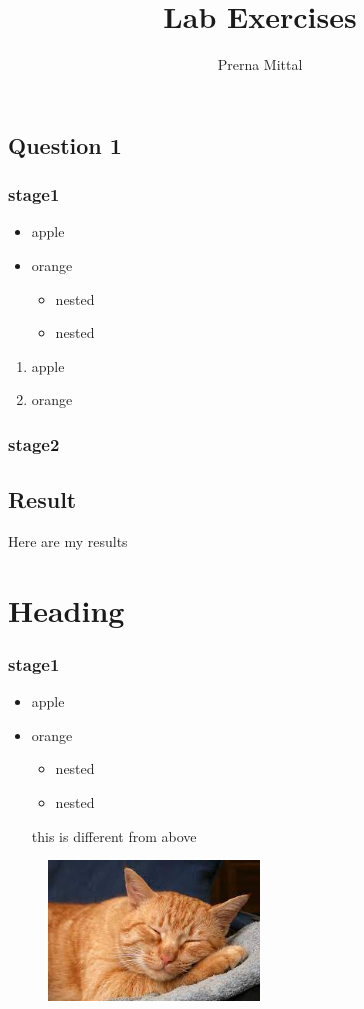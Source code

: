 \documentclass[a4paper,12pt]{report}
\begin{document}
    \title{Lab Exercises}
    \author{Prerna Mittal}
    \maketitle
    \tableofcontents
    \newpage

    \label{page2}
    \section{Question 1}
    \subsection{stage1}
    \begin{itemize}
        \item apple
        \item orange
        \begin{itemize}
            \item nested
            \item nested
        \end{itemize}
    \end{itemize}
    \begin{enumerate}
        \item apple
        \item orange
    \end{enumerate}
    \subsection{stage2}
    \section{Result}
    Here are my results
    \chapter{Heading}
    \subsection{stage1}
    \begin{itemize}
        \item apple
        \item orange
        \begin{itemize}
            \item nested
            \item nested
        \end{itemize}
    this is different from above
    \end{itemize}

    \begin{figure}[h]
        \centering
        \includegraphics[width=0.5\textwidth]{cat.jpeg}
        \label{cat}
    \end{figure}
    
\end{document}
